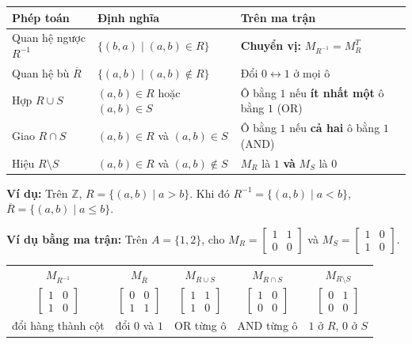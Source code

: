 \documentclass[12pt,a4paper]{article}
\begin{document}
\begin{center}
\renewcommand{\arraystretch}{1.25}
\begin{tabular}{lll}
\toprule
\textbf{Phép toán} & \textbf{Định nghĩa} & \textbf{Trên ma trận} \\
\midrule
Quan hệ ngược $R^{-1}$ & $\{(b, a) \mid (a, b) \in R\}$ & \textbf{Chuyển vị:} $M_{R^{-1}} = M_R^T$ \\
Quan hệ bù $\overline{R}$ & $\{(a, b) \mid (a, b) \notin R\}$ & Đổi $0 \leftrightarrow 1$ ở mọi ô \\
Hợp $R \cup S$ & $(a, b) \in R$ hoặc $(a, b) \in S$ & Ô bằng $1$ nếu \textbf{ít nhất một} ô bằng $1$ (OR) \\
Giao $R \cap S$ & $(a, b) \in R$ và $(a, b) \in S$ & Ô bằng $1$ nếu \textbf{cả hai} ô bằng $1$ (AND) \\
Hiệu $R \setminus S$ & $(a, b) \in R$ và $(a, b) \notin S$ & $M_R$ là $1$ \textbf{và} $M_S$ là $0$ \\
\bottomrule
\end{tabular}
\end{center}

\textbf{Ví dụ:} Trên $\mathbb{Z}$, $R = \{(a, b) \mid a > b\}$. Khi đó $R^{-1} = \{(a, b) \mid a < b\}$, $\overline{R} = \{(a, b) \mid a \le b\}$.

\textbf{Ví dụ bằng ma trận:} Trên $A = \{1, 2\}$, cho $M_R = \begin{bmatrix} 1 & 1 \\ 0 & 0 \end{bmatrix}$ và $M_S = \begin{bmatrix} 1 & 0 \\ 1 & 0 \end{bmatrix}$.

\begin{center}
\renewcommand{\arraystretch}{1.2}
\begin{tabular}{ccccc}
$M_{R^{-1}}$ & $M_{\overline{R}}$ & $M_{R \cup S}$ & $M_{R \cap S}$ & $M_{R \setminus S}$ \\[4pt]
$\begin{bmatrix} 1 & 0 \\ 1 & 0 \end{bmatrix}$ &
$\begin{bmatrix} 0 & 0 \\ 1 & 1 \end{bmatrix}$ &
$\begin{bmatrix} 1 & 1 \\ 1 & 0 \end{bmatrix}$ &
$\begin{bmatrix} 1 & 0 \\ 0 & 0 \end{bmatrix}$ &
$\begin{bmatrix} 0 & 1 \\ 0 & 0 \end{bmatrix}$ \\[14pt]
{\footnotesize đổi hàng thành cột} &
{\footnotesize đổi $0$ và $1$} &
{\footnotesize OR từng ô} &
{\footnotesize AND từng ô} &
{\footnotesize $1$ ở $R$, $0$ ở $S$}
\end{tabular}
\end{center}
\end{document}
